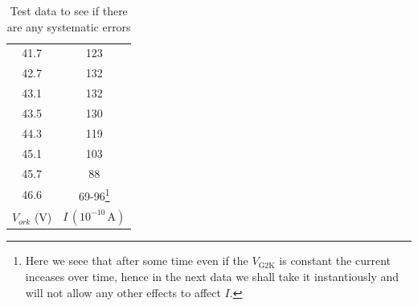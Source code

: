 \documentclass[%
sor,
 jor,
 amsmath,amssymb,
 reprint,
longbibliography,
]{revtex4-2}
\begin{document}
\begin{table}[H]
\begin{minipage}[t]{0.48\textwidth}
\begin{tabular}{|c|c|}
41.7 & 123 \\
42.7 & 132 \\
43.1 & 132 \\
43.5 & 130 \\
44.3 & 119 \\
45.1 & 103 \\
45.7 & 88  \\
46.6 & 69-96\footnote{Here we seee that after some time even if the $V_\text{G2K}$ is constant the current inceases over time, hence in the next data we shall take it instantiously and will not allow any other effects to affect $I$.}\\
\hline
$V_{ork}$ (V) & $I\,(10^{-10}\,\mathrm{A})$ \\
\hline
\end{tabular}
\end{minipage}
\caption{Test data to see if there are any systematic errors}
\end{table}
\end{document}
